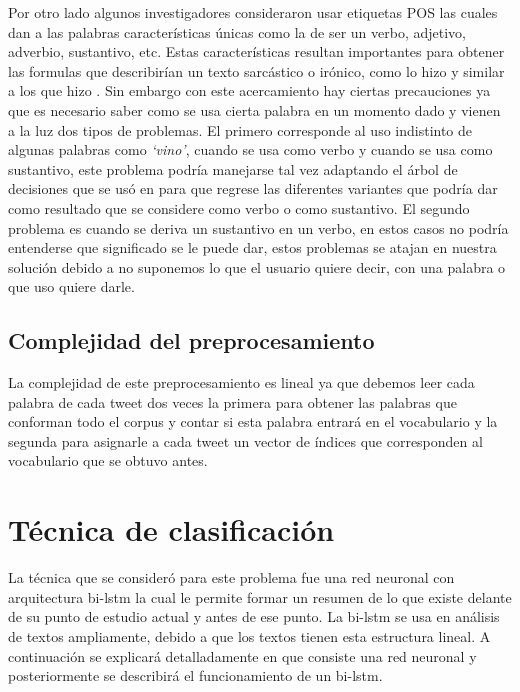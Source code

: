\par Por otro lado algunos investigadores consideraron usar etiquetas \gls{POS} las cuales dan a las palabras características únicas como la de ser un verbo, adjetivo, adverbio, sustantivo, etc. Estas características resultan importantes para obtener las formulas que describirían un texto sarcástico o irónico, como lo hizo \cite{barbieri2014italian} y similar a los que hizo \cite{davidov2010semi}. Sin embargo con este acercamiento hay ciertas precauciones ya que es necesario saber como se usa cierta palabra en un momento dado y vienen a la luz dos tipos de problemas. El primero corresponde al uso indistinto de algunas palabras como \textit{`vino'}, cuando se usa como verbo y cuando se usa como sustantivo, este problema podría manejarse tal vez adaptando el árbol de decisiones que se usó en \cite{barbieri2014italian} para que regrese las diferentes variantes que podría dar como resultado que se considere como verbo o como sustantivo. El segundo problema es cuando se deriva un sustantivo en un verbo, en estos casos no podría entenderse que significado se le puede dar, estos problemas se atajan en nuestra solución debido a no suponemos lo que el usuario quiere decir, con una palabra o que uso quiere darle.


\subsection{Complejidad del preprocesamiento}
La complejidad de este preprocesamiento es lineal ya que debemos leer cada palabra de cada tweet dos veces la primera para obtener las palabras que conforman todo el corpus y contar si esta palabra entrará en el vocabulario y la segunda para asignarle a cada tweet un vector de índices que corresponden al vocabulario que se obtuvo antes.
\section{Técnica de clasificación}

\par La técnica que se consideró para este problema fue una red neuronal con arquitectura \gls{bi-lstm} la cual le permite formar un resumen de lo que existe delante de su punto de estudio actual y antes de ese punto. La \gls{bi-lstm} se usa en análisis de textos ampliamente, debido a que los textos tienen esta estructura lineal. A continuación se explicará detalladamente en que consiste una red neuronal y posteriormente se describirá el funcionamiento de un \gls{bi-lstm}.

